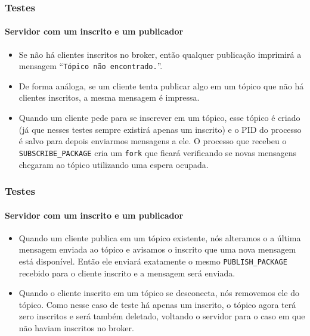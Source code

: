 \documentclass[10pt]{beamer}
\begin{document}
    \begin{frame}[t]
      \frametitle{Testes}
      \framesubtitle{Servidor com um inscrito e um publicador}
      \begin{itemize}
        \item Se não há clientes inscritos no broker, então qualquer publicação
          imprimirá a mensagem  ``\texttt{Tópico não encontrado.}''.
        \item De forma análoga, se um cliente tenta publicar algo em um tópico
          que não há clientes inscritos, a mesma mensagem é impressa.
        \item Quando um cliente pede para se inscrever em um tópico, esse tópico
          é criado (já que nesses testes sempre existirá apenas um inscrito) e
          o PID do processo é salvo para depois enviarmos mensagens a ele.
          O processo que recebeu o \texttt{SUBSCRIBE\_PACKAGE} cria um
          \texttt{fork} que ficará verificando se novas mensagens chegaram ao
          tópico utilizando uma espera ocupada.
      \end{itemize}
    \end{frame}

    \begin{frame}[t]
      \frametitle{Testes}
      \framesubtitle{Servidor com um inscrito e um publicador}
      \begin{itemize}
        \item Quando um cliente publica em um tópico existente, nós alteramos o
          a última mensagem enviada ao tópico e avisamos o inscrito que uma nova
          mensagem está disponível. Então ele enviará exatamente o mesmo
          \texttt{PUBLISH\_PACKAGE} recebido para o cliente inscrito e a
          mensagem será enviada.
        \item Quando o cliente inscrito em um tópico se desconecta, nós
          removemos ele do tópico. Como nesse caso de teste há apenas um
          inscrito, o tópico agora terá zero inscritos e será também deletado,
          voltando o servidor para o caso em que não haviam inscritos no broker.
      \end{itemize}
    \end{frame}
\end{document}
